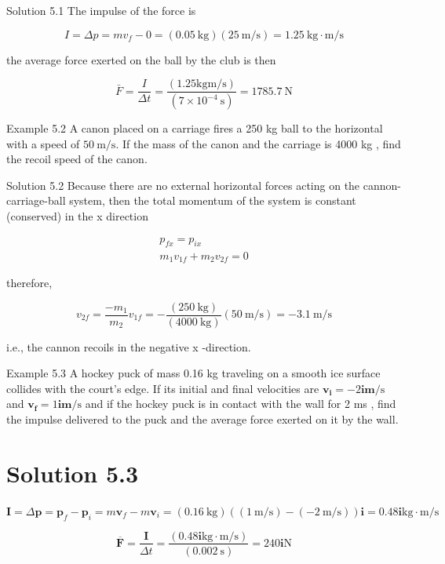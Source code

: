 \documentclass[10pt]{article}
\begin{document}
Solution 5.1 The impulse of the force is

$$
I=\Delta p=m v_{f}-0=(0.05 \mathrm{~kg})(25 \mathrm{~m} / \mathrm{s})=1.25 \mathrm{~kg} \cdot \mathrm{m} / \mathrm{s}
$$

the average force exerted on the ball by the club is then

$$
\bar{F}=\frac{I}{\Delta t}=\frac{(1.25 \mathrm{kgm} / \mathrm{s})}{\left(7 \times 10^{-4} \mathrm{~s}\right)}=1785.7 \mathrm{~N}
$$

Example 5.2 A canon placed on a carriage fires a 250 kg ball to the horizontal with a speed of $50 \mathrm{~m} / \mathrm{s}$. If the mass of the canon and the carriage is 4000 kg , find the recoil speed of the canon.

Solution 5.2 Because there are no external horizontal forces acting on the cannon-carriage-ball system, then the total momentum of the system is constant (conserved) in the x direction

$$
\begin{gathered}
p_{f x}=p_{i x} \\
m_{1} v_{1 f}+m_{2} v_{2 f}=0
\end{gathered}
$$

therefore,

$$
v_{2 f}=\frac{-m_{1}}{m_{2}} v_{1 f}=-\frac{(250 \mathrm{~kg})}{(4000 \mathrm{~kg})}(50 \mathrm{~m} / \mathrm{s})=-3.1 \mathrm{~m} / \mathrm{s}
$$

i.e., the cannon recoils in the negative x -direction.

Example 5.3 A hockey puck of mass 0.16 kg traveling on a smooth ice surface collides with the court's edge. If its initial and final velocities are $\mathbf{v}_{\mathbf{i}}=-2 \mathbf{i m} / \mathrm{s}$ and $\mathbf{v}_{\mathbf{f}}=1 \mathbf{i m} / \mathrm{s}$ and if the hockey puck is in contact with the wall for 2 ms , find the impulse delivered to the puck and the average force exerted on it by the wall.

\section*{Solution 5.3}
$\mathbf{I}=\Delta \mathbf{p}=\mathbf{p}_{f}-\mathbf{p}_{i}=m \mathbf{v}_{f}-m \mathbf{v}_{i}=(0.16 \mathrm{~kg})((1 \mathrm{~m} / \mathrm{s})-(-2 \mathrm{~m} / \mathrm{s})) \mathbf{i}=0.48 \mathbf{i} \mathrm{kg} \cdot \mathrm{m} / \mathrm{s}$

$$
\overline{\mathbf{F}}=\frac{\mathbf{I}}{\Delta t}=\frac{(0.48 \mathbf{i} \mathrm{kg} \cdot \mathrm{m} / \mathrm{s})}{(0.002 \mathrm{~s})}=240 \mathbf{i} \mathrm{N}
$$
\end{document}
